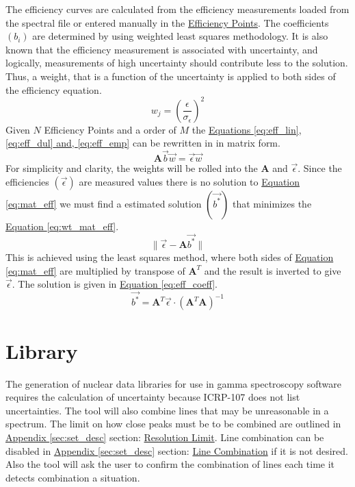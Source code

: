 \documentclass[12pt,report,justified]{SANDreport}
\begin{document}
The efficiency curves are calculated from the efficiency measurements loaded from the spectral file
or entered manually in the \hyperref[itm:eff_pts]{Efficiency Points}. The coefficients \(\left( b_i \right)\) are determined by using weighted
least squares methodology. It is also known that the efficiency measurement is associated with
uncertainty, and logically, measurements of high uncertainty should contribute less to the solution.
Thus, a weight, that is a function of the uncertainty is applied to both sides of the efficiency
equation.
\begin{equation}
w_j = \left( \frac{\epsilon}{\sigma_{\epsilon}} \right)^2
\label{eq:eff_wgt}
\end{equation}
Given \(N\) Efficiency Points and a order of \(M\) the \hyperref[eq:eff_lin]{Equations \ref{eq:eff_lin}, \ref{eq:eff_dul} and, \ref{eq:eff_emp}} can be rewritten in in matrix form.
\begin{equation}
\mathbf{A} \overrightarrow{b} \overrightarrow{w} = \overrightarrow{\epsilon} \overrightarrow{w}
\label{eq:mat_eff}
\end{equation}
For simplicity and clarity, the weights will be rolled into the \(\mathbf{A}\) and \(\overrightarrow{\epsilon}\). Since the efficiencies
\(\left(\overrightarrow{\epsilon}\right)\) are measured values there is no solution to \hyperref[eq:mat_eff]{Equation \ref{eq:mat_eff}} we must find a estimated solution \(\left(\overrightarrow{b^*}\right)\) that minimizes the \hyperref[eq:wt_mat_eff]{Equation \ref{eq:wt_mat_eff}}.
\begin{equation}
\| \overrightarrow{\epsilon} - \mathbf{A}\overrightarrow{b^*} \|
\label{eq:wt_mat_eff}
\end{equation}
This is achieved using the least squares method, where both sides of \hyperref[eq:mat_eff]{Equation \ref{eq:mat_eff}} are multiplied by
transpose of \(\mathbf{A}^T\) and the result is inverted to give \(\overrightarrow{\epsilon }\). The solution is given in \hyperref[eq:eff_coeff]{Equation \ref{eq:eff_coeff}}.
\begin{equation}
\overrightarrow{b^*} = \mathbf{A}^T\overrightarrow{\epsilon} \cdot \left( \mathbf{A}^T \mathbf{A} \right)^{-1}
\label{eq:eff_coeff}
\end{equation}


\section{Library}\label{sec:library}
The generation of nuclear data libraries for use in gamma spectroscopy software requires the calculation
of uncertainty because ICRP-107 does not list uncertainties. The tool will also combine
lines that may be unreasonable in a spectrum. The limit on how close peaks must be to be combined
are outlined in \hyperref[sec:set_desc]{Appendix \ref{sec:set_desc}} section: \hyperref[itm:res_lim]{Resolution Limit}. Line combination can be disabled
in \hyperref[sec:set_desc]{Appendix \ref{sec:set_desc}} section: \hyperref[itm:ln_combo]{Line Combination} if it is not desired. Also the tool will ask the user to
confirm the combination of lines each time it detects combination a situation.
\end{document}
